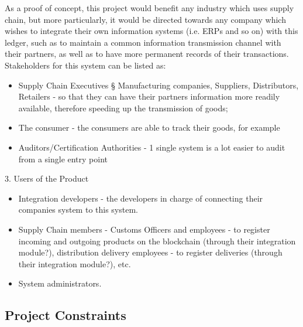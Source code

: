 	As a proof of concept, this project would benefit any industry which uses supply chain, but more particularly, it would be directed towards any company which wishes to integrate their own information systems (i.e. ERPs and so on) with this ledger, such as to maintain a common information transmission channel with their partners, as well as to have more permanent records of their transactions. Stakeholders for this system can be listed as:
    \begin{itemize}
		\item Supply Chain Executives
			§ Manufacturing companies, Suppliers, Distributors, Retailers - so that they can have their partners information more readily available, therefore speeding up the transmission of goods;
		\item The consumer - the consumers are able to track their goods, for example
		\item Auditors/Certification Authorities - 1 single system is a lot easier to audit from a single entry point
	\end{itemize}
	3. Users of the Product
		\begin{itemize}
		\item Integration developers - the developers in charge of connecting their companies system to this system.
		\item Supply Chain members - Customs Officers and employees - to register incoming and outgoing products on the blockchain (through their integration module?), distribution delivery employees - to register deliveries (through their integration module?), etc.
		\item System administrators.
	\end{itemize}

\subsection{Project Constraints}

